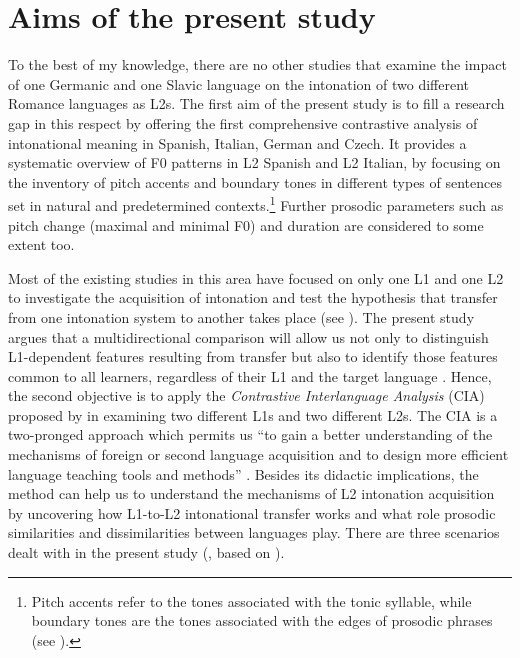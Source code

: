 \section{Aims of the present study}\label{sec:1.2}\largerpage %

To the best of my knowledge, there are no other studies that examine the impact of one Germanic and one Slavic language on the intonation of two different Romance languages as L2s. The first aim of the present study is to fill a research gap in this respect by offering the first comprehensive contrastive analysis of intonational meaning in Spanish, Italian, German and Czech. It provides a systematic overview of F0 patterns in L2 Spanish and L2 Italian, by focusing on the inventory of pitch accents and boundary tones in different types of sentences set in natural and predetermined contexts.\footnote{Pitch accents refer to the tones associated with the tonic syllable, while boundary tones are the tones associated with the edges of prosodic phrases (see ).} Further prosodic parameters such as pitch change (maximal and minimal F0) and duration are considered to some extent too.


Most of the existing studies in this area have focused on only one L1 and one L2 to investigate the acquisition of intonation and test the hypothesis that transfer from one intonation system to another takes place (see ). The present study argues that a multidirectional comparison will allow us not only to distinguish L1-dependent features resulting from transfer but also to identify those features common to all learners, regardless of their L1 and the target language \citep[12]{Granger2015}. Hence, the second objective is to apply the \textit{Contrastive Interlanguage Analysis} (CIA) proposed by \citet{Granger1996} in examining two different L1s and two different L2s. The CIA is a two-pronged approach which permits us “to gain a better understanding of the mechanisms of foreign or second language acquisition and to design more efficient language teaching tools and methods” \citep[9]{Granger2015}. Besides its didactic implications, the method can help us to understand the mechanisms of L2 intonation acquisition by uncovering how L1-to-L2 intonational transfer works and what role prosodic similarities and dissimilarities between languages play. There are three scenarios dealt with in the present study (, based on \citealt{Granger1996,Granger2015}).




